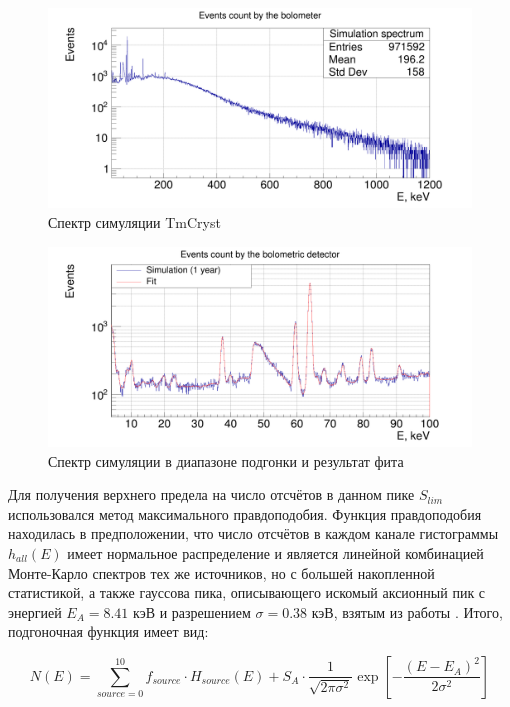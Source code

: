 \documentclass[a4paper,article,14pt]{extarticle}
\begin{document}
\begin{figure}[h!]
    \centering
    \includegraphics[width = \textwidth]{images/SpectrumTmCryst.png}
    \caption{Спектр симуляции TmCryst}
   \label{hist_all}
 \end{figure}

\begin{figure}[h!]
    \centering
    \includegraphics[width = \textwidth]{images/axion_fit.png}
    \caption{Спектр симуляции в диапазоне подгонки и результат фита}
   \label{AxionFit}
 \end{figure}
Для получения верхнего предела на число отсчётов в данном пике $S_{lim}$ использовался метод максимального правдоподобия. Функция правдоподобия находилась в предположении, что число отсчётов в каждом канале гистограммы $h_{all} \left( E \right)$ имеет нормальное распределение и является линейной комбинацией Монте-Карло спектров тех же источников, но с большей накопленной статистикой, а также гауссова пика, описывающего искомый аксионный пик с энергией $E_A = 8.41 \text{ кэВ}$ и разрешением $\sigma = 0.38 \text{ кэВ}$, взятым из работы \cite{test_bolometric_tm}. Итого, подгоночная функция имеет вид:

\begin{equation}
    N\left( E \right) = \sum\limits_{source = 0}^{10} {{f_{source}} \cdot {H_{source}}\left( E \right)}  + {S_A} \cdot \frac{1}{{\sqrt {2\pi {\sigma ^2}} }}\exp \left[ { - \frac{{{{\left( {E - {E_A}} \right)}^2}}}{{2{\sigma ^2}}}} \right]
\end{equation}
\end{document}
